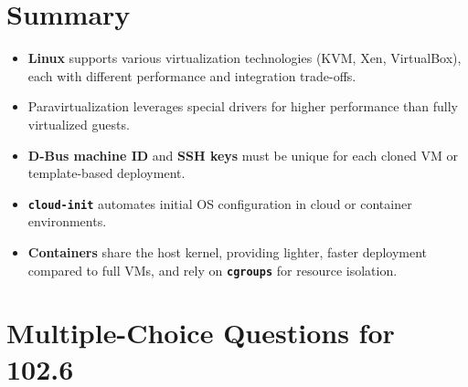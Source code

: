 \documentclass[a4paper]{report}
\begin{document}
\section*{Summary}

\begin{itemize}
    \item \textbf{Linux} supports various virtualization technologies (KVM, Xen, VirtualBox), each with different performance and integration trade-offs.
    \item Paravirtualization leverages special drivers for higher performance than fully virtualized guests.
    \item \textbf{D-Bus machine ID} and \textbf{SSH keys} must be unique for each cloned VM or template-based deployment.
    \item \textbf{\texttt{cloud-init}} automates initial OS configuration in cloud or container environments.
    \item \textbf{Containers} share the host kernel, providing lighter, faster deployment compared to full VMs, and rely on \textbf{\texttt{cgroups}} for resource isolation.
\end{itemize}

\newpage
\section*{Multiple-Choice Questions for 102.6}
\end{document}
